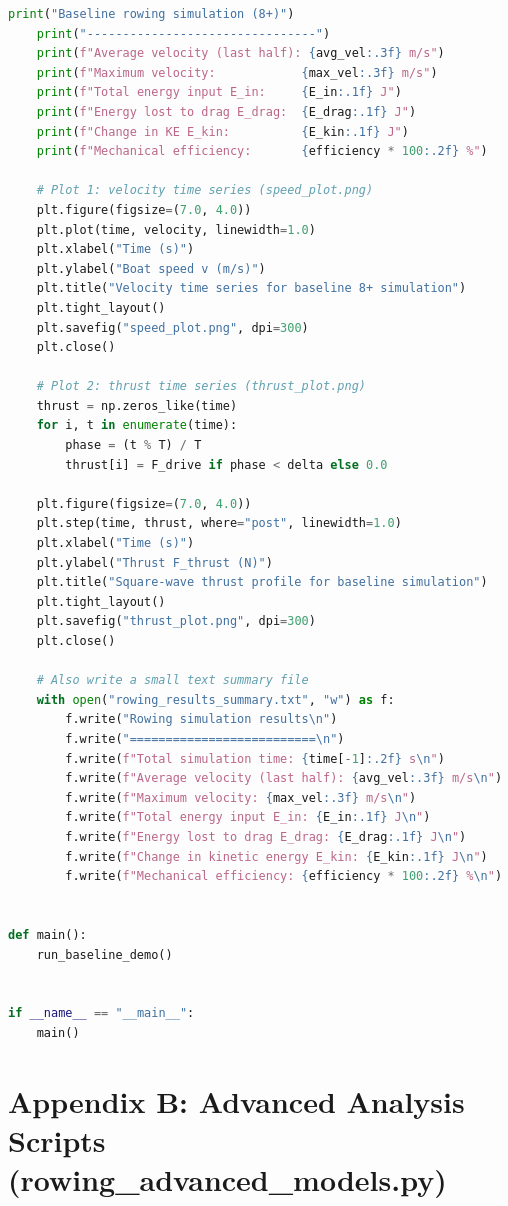 \documentclass[12pt]{article}
\begin{document}
\begin{lstlisting}[language=Python,caption={Baseline 8+ simulation used for the velocity and thrust plots.},label={lst:rowing_model}]
    print("Baseline rowing simulation (8+)")
    print("--------------------------------")
    print(f"Average velocity (last half): {avg_vel:.3f} m/s")
    print(f"Maximum velocity:            {max_vel:.3f} m/s")
    print(f"Total energy input E_in:     {E_in:.1f} J")
    print(f"Energy lost to drag E_drag:  {E_drag:.1f} J")
    print(f"Change in KE E_kin:          {E_kin:.1f} J")
    print(f"Mechanical efficiency:       {efficiency * 100:.2f} %")

    # Plot 1: velocity time series (speed_plot.png)
    plt.figure(figsize=(7.0, 4.0))
    plt.plot(time, velocity, linewidth=1.0)
    plt.xlabel("Time (s)")
    plt.ylabel("Boat speed v (m/s)")
    plt.title("Velocity time series for baseline 8+ simulation")
    plt.tight_layout()
    plt.savefig("speed_plot.png", dpi=300)
    plt.close()

    # Plot 2: thrust time series (thrust_plot.png)
    thrust = np.zeros_like(time)
    for i, t in enumerate(time):
        phase = (t % T) / T
        thrust[i] = F_drive if phase < delta else 0.0

    plt.figure(figsize=(7.0, 4.0))
    plt.step(time, thrust, where="post", linewidth=1.0)
    plt.xlabel("Time (s)")
    plt.ylabel("Thrust F_thrust (N)")
    plt.title("Square-wave thrust profile for baseline simulation")
    plt.tight_layout()
    plt.savefig("thrust_plot.png", dpi=300)
    plt.close()

    # Also write a small text summary file
    with open("rowing_results_summary.txt", "w") as f:
        f.write("Rowing simulation results\n")
        f.write("==========================\n")
        f.write(f"Total simulation time: {time[-1]:.2f} s\n")
        f.write(f"Average velocity (last half): {avg_vel:.3f} m/s\n")
        f.write(f"Maximum velocity: {max_vel:.3f} m/s\n")
        f.write(f"Total energy input E_in: {E_in:.1f} J\n")
        f.write(f"Energy lost to drag E_drag: {E_drag:.1f} J\n")
        f.write(f"Change in kinetic energy E_kin: {E_kin:.1f} J\n")
        f.write(f"Mechanical efficiency: {efficiency * 100:.2f} %\n")


def main():
    run_baseline_demo()


if __name__ == "__main__":
    main()
\end{lstlisting}

\newpage

\section*{Appendix B: Advanced Analysis Scripts \newline(rowing\_advanced\_models.py)}
\end{document}
